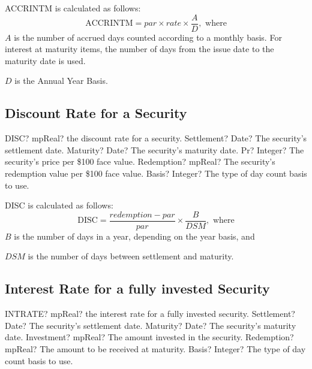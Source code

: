 \vspace{0.3cm}
ACCRINTM is calculated as follows: 
\begin{equation}
\text{ACCRINTM} = par \times rate \times \frac{A}{D} , \text{ where}
\end{equation}
$A$ is the number of accrued days counted according to a monthly basis. For interest at maturity items, the number of days from the issue date to the maturity date is used.

$D$ is the Annual Year Basis.






\subsection{Discount Rate for a Security}


\begin{mpFunctionsExtract}
	\mpWorksheetFunctionFiveNotImplemented
	{DISC? mpReal? the discount rate for a security.}
	{Settlement? Date?  The security's settlement date.}
	{Maturity? Date? The security's maturity date.}
	{Pr? Integer?  The security's price per \$100 face value.}
	{Redemption? mpReal? The security's redemption value per \$100 face value.}
	{Basis? Integer? The type of day count basis to use.}
\end{mpFunctionsExtract}

\vspace{0.3cm}
DISC is calculated as follows: 
\begin{equation}
\text{DISC} = \frac{redemption - par}{par} \times \frac{B}{DSM} , \text{ where}
\end{equation}
$B$ is the number of days in a year, depending on the year basis, and

$DSM$ is the number of days between settlement and maturity.






\subsection{Interest Rate for a fully invested Security}


\begin{mpFunctionsExtract}
	\mpWorksheetFunctionFiveNotImplemented
	{INTRATE? mpReal? the interest rate for a fully invested security.}
	{Settlement? Date?  The security's settlement date.}
	{Maturity? Date? The security's maturity date.}
	{Investment? mpReal?  The amount invested in the security.}
	{Redemption? mpReal? The amount to be received at maturity.}
	{Basis? Integer? The type of day count basis to use.}
\end{mpFunctionsExtract}

